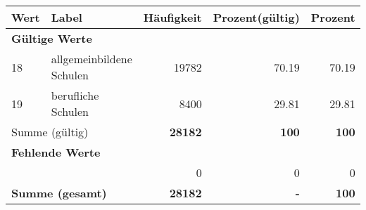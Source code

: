      \begin{longtable}{lXrrr}
     \toprule
     \textbf{Wert} & \textbf{Label} & \textbf{Häufigkeit} & \textbf{Prozent(gültig)} & \textbf{Prozent} \\
     \endhead
     \midrule
     \multicolumn{5}{l}{\textbf{Gültige Werte}}\\

     18 &
     \multicolumn{1}{X}{ allgemeinbildene Schulen   } &


       \num{19782} &
       \num[round-mode=places,round-precision=2]{70,19} &
         \num[round-mode=places,round-precision=2]{70,19} \\

     19 &
     \multicolumn{1}{X}{ berufliche Schulen   } &


       \num{8400} &
       \num[round-mode=places,round-precision=2]{29,81} &
         \num[round-mode=places,round-precision=2]{29,81} \\
     \midrule
     \multicolumn{2}{l}{Summe (gültig)} &
       \textbf{\num{28182}} &
     \textbf{100} &
       \textbf{\num[round-mode=places,round-precision=2]{100}} \\
     \multicolumn{5}{l}{\textbf{Fehlende Werte}}\\
      & & 0 & 0 & 0 \\
     \midrule
     \multicolumn{2}{l}{\textbf{Summe (gesamt)}} &
          \textbf{\num{28182}} &
        \textbf{-} &
        \textbf{100} \\
     \bottomrule
     \end{longtable}
     
